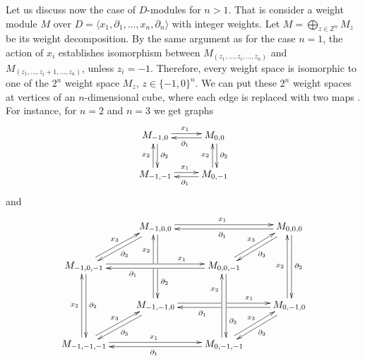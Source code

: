 Let us discuss now the case of $D$-modules for $n>1$. That is consider a weight module $M$ over $D=\langle x_1, \partial_1, \dots, x_n,\partial_n\rangle$ with integer weights. Let $M=\bigoplus_{z\in\mathbb{Z}^n}M_z$ be its weight decomposition. By the same argument as for the case $n=1$, the action of $x_i$ establishes isomorphism between $M_{(z_1,\dots,z_i,\dots,z_n)}$ and $M_{(z_1,\dots,z_i+1,\dots,z_n)}$, unless $z_i=-1$. Therefore, every weight space is isomorphic to one of the $2^n$ weight space $M_z$, $z\in \{-1,0\}^n$. We can put these $2^n$ weight spaces at vertices of an $n$-dimensional cube, where each edge is replaced with two maps 
 . For instance, for $n=2$ and $n=3$ we get graphs
$$
\xymatrix{ M_{-1,0}\ar@<0.5ex>[r]^{x_1} \ar@<0.5ex>[d]^{\partial_2}&  M_{0,0}\ar@<0.5ex>[d]^{\partial_2} \ar@<0.5ex>[l]^{\partial_1}\\
 M_{-1,-1}\ar@<0.5ex>[r]^{x_1} \ar@<0.5ex>[u]^{x_2}& M_{0,-1}  \ar@<0.5ex>[l]^{\partial_1}\ar@<0.5ex>[u]^{x_2}}
 $$ %
 and $$
 \xymatrix{& 
 M_{-1,0,0}\ar@<0.5ex>[dl]^{\partial_3}\ar@<0.5ex>[rr]^{x_1}\ar@<0.5ex>[dd]^(.7){\partial_2}|!{[dl];[dr]}\hole& & M_{0,0,0} \ar@<0.5ex>[ll]^{\partial_1}\ar@<0.5ex>[dd]^{\partial_2} \ar@<0.5ex>[dl]^{\partial_3}\\
 M_{-1,0,-1} \ar@<0.5ex>[ur]^{x_3}\ar@<0.5ex>[rr]^(0.7){x_1}\ar@<0.5ex>[dd]^{\partial_2}& & 
 M_{0,0,-1} \ar@<0.5ex>[ll]^(.65){\partial_1}\ar@<0.5ex>[ur]^{x_3}\ar@<0.5ex>[dd]^(0.7){\partial_2}\\& 
 M_{-1,-1,0} \ar@<0.5ex>[uu]^(.7){x_2}|!{[ur];[ul]}\hole\ar@<0.5ex>[rr]^(0.7){x_1}|!{[dr];[ur]}\hole \ar@<0.5ex>[dl]^{\partial_3}& & 
 M_{0,-1,0} \ar@<0.5ex>[ll]^(0.65){\partial_1}|!{[dl];[ul]}\hole \ar@<0.5ex>[dl]^{\partial_3} \ar@<0.5ex>[uu]^{x_2}\\
 M_{-1,-1,-1} \ar@<0.5ex>[ur]^{x_3}\ar@<0.5ex>[uu]^{x_2} \ar@<0.5ex>[rr]^{x_1}& & 
 M_{0,-1,-1} \ar@<0.5ex>[ur]^{x_3} \ar@<0.5ex>[uu]^(0.7){x_2} \ar@<0.5ex>[ll]^{\partial_1}}
$$
